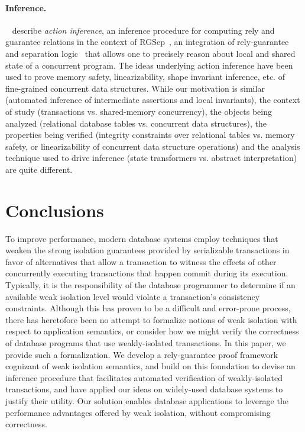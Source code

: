 \paragraph{Inference.}  ~\cite{Vaf10,Vaf10a}
describe \emph{action inference}, an inference procedure for computing
rely and guarantee relations in the context of RGSep~\cite{VP07}, an
integration of rely-guarantee and separation logic~\cite{Rey02} that
allows one to precisely reason about local and shared state of a
concurrent program. The ideas underlying action inference have been
used to prove memory safety, linearizability, shape invariant
inference, etc.  of fine-grained concurrent data structures.  While
our motivation is similar (automated inference of intermediate
assertions and local invariants), the context of study (transactions
vs. shared-memory concurrency), the objects being analyzed (relational
database tables vs. concurrent data structures), the properties being
verified (integrity constraints over relational tables vs. memory
safety, or linearizability of concurrent data structure operations)
and the analysis technique used to drive inference (state transformers
vs. abstract interpretation) are quite different.
\vspace*{-7pt}
\section{Conclusions}
\label{sec:conclusions}

To improve performance, modern database systems employ techniques that
weaken the strong isolation guarantees provided by serializable
transactions in favor of alternatives that allow a transaction to
witness the effects of other concurrently executing transactions that
happen commit during its execution.  Typically, it is the
responsibility of the database programmer to determine if an available
weak isolation level would violate a transaction's consistency
constraints.  Although this has proven to be a difficult and
error-prone process, there has heretofore been no attempt to formalize
notions of weak isolation with respect to application semantics, or
consider how we might verify the correctness of database programs that
use weakly-isolated transactions.  In this paper, we provide such a
formalization.  We develop a rely-guarantee proof framework cognizant
of weak isolation semantics, and build on this foundation to devise an
inference procedure that facilitates automated verification of
weakly-isolated transactions, and have applied our ideas on
widely-used database systems to justify their utility.  Our solution
enables database applications to leverage the performance advantages
offered by weak isolation, without compromising correctness.




